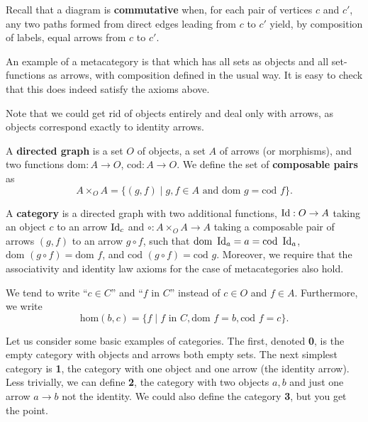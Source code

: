 \documentclass{../../mathnotes}
\begin{document}
Recall that a diagram is \textbf{commutative} when, for each pair of vertices $c$ and $c'$, any
two paths formed from direct edges leading from $c$ to $c'$ yield, by composition of labels, equal arrows
from $c$ to $c'$.

\begin{exmp}
    An example of a metacategory is that which has all sets as objects and all set-functions as arrows,
    with composition defined in the usual way.  It is easy to check that this does indeed satisfy the axioms above.
\end{exmp}

\begin{rem}
    Note that we could get rid of objects entirely and deal only with arrows, as objects correspond
    exactly to identity arrows.
\end{rem}

\begin{defn}
    A \textbf{directed graph} is a set $O$ of objects, a set $A$ of arrows (or morphisms), and two functions $\text{dom}:A\to O$,
    $\text{cod}:A\to O$. We define the set of \textbf{composable pairs} as
    \[A\times_OA=\{(g,f)\mid g,f\in A\text{ and }\text{dom }g=\text{cod }f\}.\]
\end{defn}

\begin{defn}
    A \textbf{category} is a directed graph with two additional functions, $\operatorname{Id}:O\to A$ taking an object
    $c$ to an arrow $\operatorname{Id}_c$ and $\circ:A\times_OA\to A$ taking a composable pair of arrows $(g,f)$ to
    an arrow $g\circ f$, such that $\text{dom }\operatorname{Id}_a=a=\text{cod }\operatorname{Id}_a$, $\text{dom }(g\circ f)=\text{dom }f$,
    and $\text{cod }(g\circ f)=\text{cod }g$. Moreover, we require that the associativity and identity law axioms
    for the case of metacategories also hold.
\end{defn}

\begin{rem}
    We tend to write ``$c\in C$'' and ``$f$ in $C$'' instead of $c\in O$ and $f\in A$. Furthermore, we write
    \[\text{hom}(b,c)=\{f\mid f\text{ in }C, \text{dom }f=b,\text{cod }f=c\}.\]
\end{rem}

\begin{exmp}
    Let us consider some basic examples of categories. The first, denoted \textbf{0}, is the empty category
    with objects and arrows both empty sets. The next simplest category is \textbf{1}, the category with one object
    and one arrow (the identity arrow). Less trivially, we can define \textbf{2}, the category with two objects $a,b$
    and just one arrow $a\to b$ not the identity. We could also define the category \textbf{3}, but you get the point.
\end{exmp}
\end{document}
